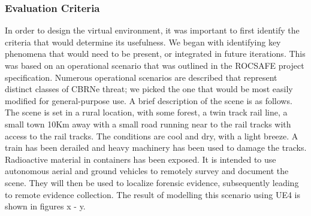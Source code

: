
\subsubsection{Evaluation Criteria}
In order to design the virtual environment, it was important to first identify the criteria that would determine its usefulness. We began with identifying key phenomena that would need to be present, or integrated in future iterations. This was based on an operational scenario that was outlined in the ROCSAFE project specification\cite{rocsafeNUIG}. Numerous operational scenarios are described that represent distinct classes of CBRNe threat; we picked the one that would be most easily modified for general-purpose use.
A brief description of the scene is as follows. The scene is set in a rural location, with some forest, a twin track rail line, a small town 10Km away with a small road running near to the rail tracks with access to the rail tracks. The conditions are cool and dry, with a light breeze. A train has been derailed and heavy machinery has been used to damage the tracks. Radioactive material in containers has been exposed. It is intended to use autonomous aerial and ground vehicles to remotely survey and document the scene. They will then be used to localize forensic evidence, subsequently leading to remote evidence collection. The result of modelling this scenario using UE4 is shown in figures x - y.%

